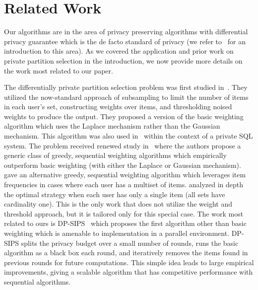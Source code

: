 \section{Related Work}
Our algorithms are in the area of privacy preserving algorithms with differential privacy guarantee which is the de facto standard of privacy (we refer to~\cite{dwork2014book} for an introduction to this area). As we covered the application and prior work on private partition selection in the introduction, we now provide more details on the work most related to our paper.

The differentially private partition selection problem was first studied in~\cite{korolova2009releasing}. They utilized the now-standard approach of subsampling to limit the number of items in each user's set, constructing weights over items, and thresholding noised weights to produce the output. They proposed a version of the basic weighting algorithm which uses the Laplace mechanism rather than the Gaussian mechanism. This algorithm was also used in~\cite{wilson2020dpsql} within the context of a private SQL system.
The problem received renewed study in~\cite{gopi2020dpunion} where the authors propose a generic class of greedy, sequential weighting algorithms which empirically outperform basic weighting (with either the Laplace or Gaussian mechanism). \cite{carvalho2022incorporatingitem} gave an alternative greedy, sequential weighting algorithm which leverages item frequencies in cases where each user has a multiset of items.
\cite{desfontaines2022dppartition} analyzed in depth the optimal strategy when each user has only a single item (all sets have cardinality one). This is the only work that does not utilize the weight and threshold approach, but it is tailored only for this special case.
The work most related to ours is DP-SIPS~\cite{swanberg2023dpsips} which proposes the first algorithm other than basic weighting which is amenable to implementation in a parallel environment. DP-SIPS splits the privacy budget over a small number of rounds, runs the basic algorithm as a black box each round, and iteratively removes the items found in previous rounds for future computations. This simple idea leads to large empirical improvements, giving a scalable algorithm that has competitive performance with sequential algorithms.